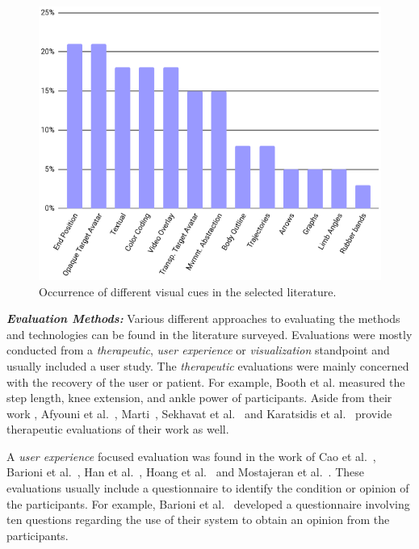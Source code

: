 \begin{figure}[tb]
    \includegraphics[width=\linewidth]{pictures/CueHistogram.PNG}
    \caption{Occurrence of different visual cues in the selected literature.\label{fig:CueHistogram}}
\end{figure}

\textbf{\emph{Evaluation Methods:}} Various different approaches to evaluating the methods and technologies can be found in the literature surveyed. Evaluations were mostly conducted from a \emph{therapeutic}, \emph{user experience} or \emph{visualization} standpoint and usually included a user study. The \emph{therapeutic} evaluations were mainly concerned with the recovery of the user or patient. For example, Booth et al.\cite{booth2019msr} measured the step length, knee extension, and ankle power of participants. Aside from their work \cite{booth2019msr}\cite{booth2019vue}, Afyouni et al.~\cite{afyouni2020arb}, Marti~\cite{marti2019evl}, Sekhavat et al.~\cite{sekhavat2018pba} and Karatsidis et al.~\cite{karatsidis2018vwv} provide therapeutic evaluations of their work as well.

A \emph{user experience} focused evaluation was found in the work of Cao et al.~\cite{cao2020esa}, Barioni et al.~\cite{barioni2019bvr}, Han et al.~\cite{han2016ara}, Hoang et al.~\cite{hoang2016orp} and Mostajeran et al.~\cite{mostajeran2019hvc}. These evaluations usually include a questionnaire to identify the condition or opinion of the participants. For example, Barioni et al.~\cite{barioni2019bvr} developed a questionnaire involving ten questions regarding the use of their system to obtain an opinion from the participants.

